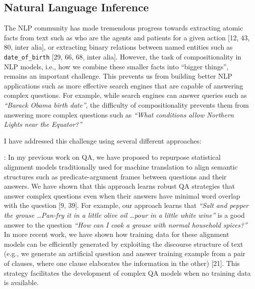 \documentclass[10pt]{article}
\begin{document}
\subsection*{Natural Language Inference}

The NLP community has made tremendous progress towards extracting atomic facts from text such as who are the agents and patients for a given action [12, 43, 80, inter alia], or extracting binary relations between named entities such as {\tt date\_of\_birth}  [29, 66, 68, inter alia].
However, the task of compositionality in NLP models, i.e., how we combine these smaller facts into ``bigger things'', remains an important challenge. This prevents us from building better NLP applications such as more effective search engines that are capable of answering complex questions. 
For example, while search engines can answer queries such as {\em ``Barack Obama birth date''}, the difficulty of compositionality prevents them from answering more complex questions such as {\em ``What conditions allow Northern Lights near the Equator?''}

I have addressed this challenge using several different approaches:

{}: In my previous work on QA, we have proposed to repurpose statistical alignment models traditionally used for machine translation to align semantic structures such as predicate-argument frames between questions and their answers. We have shown that this approach learns robust QA strategies that answer complex questions even when their  answers have minimal word overlap with the question [9, 39]. 
For example, our approach learns that {\em ``Salt and pepper the grouse \ldots Pan-fry it in a little olive oil \ldots pour in a little white wine''} is a good answer to the question {\em ``How can I cook a grouse with normal household spices?''}
In more recent work, we have shown how training data for these alignment models can be efficiently generated by exploiting the discourse structure of text (e.g., we generate an artificial question and answer training example from a pair of clauses, where one clause elaborates the information in the other) [21]. This strategy facilitates the development of complex QA models when no training data is available.
\end{document}
